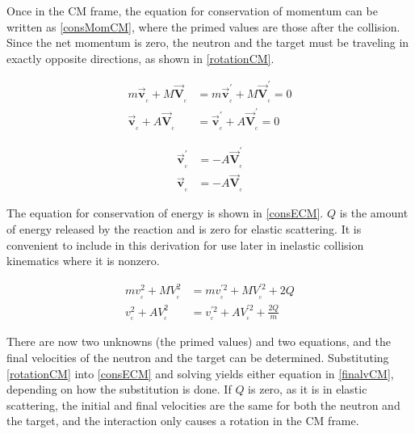 Once in the CM frame, the equation for conservation of momentum can be written as \eqref{consMomCM}, where the primed values are those after the collision.  Since the net momentum is zero, the neutron and the target must be traveling in exactly opposite directions, as shown in \eqref{rotationCM}.

\begin{equation}
\begin{split}
m \boldsymbol{\vec{v}_{_\mathrm{c}}} + M \boldsymbol{\vec{V}_{_\mathrm{c}}} &= m \boldsymbol{\vec{v}_{_\mathrm{c}}^\prime} + M \boldsymbol{\vec{V}_{_\mathrm{c}}^\prime} = 0\\
    \boldsymbol{\vec{v}_{_\mathrm{c}}} + A  \boldsymbol{\vec{V}_{_\mathrm{c}}} &=     \boldsymbol{\vec{v}_{_\mathrm{c}}^\prime} + A  \boldsymbol{\vec{V}_{_\mathrm{c}}^\prime} = 0
\end{split}
\label{consMomCM}
\end{equation}

\begin{equation}
\begin{split}
\boldsymbol{\vec{v}_{_\mathrm{c}}^\prime} &= - A  \boldsymbol{\vec{V}_{_\mathrm{c}}^\prime} \\
\boldsymbol{\vec{v}_{_\mathrm{c}}} &= -A  \boldsymbol{\vec{V}_{_\mathrm{c}}}
\end{split}
\label{rotationCM}
\end{equation}

The equation for conservation of energy is shown in \eqref{consECM}.  $Q$ is the amount of energy released by the reaction and is zero for elastic scattering.  It is convenient to include in this derivation for use later in inelastic collision kinematics where it is nonzero.

\begin{equation}
\begin{split}
m v_{_\mathrm{c}}^2 + M V_{_\mathrm{c}}^2 &= m v_{_\mathrm{c}}^{\prime2} + M V_{_\mathrm{c}}^{\prime2} + 2Q \\
    v_{_\mathrm{c}}^2 + A  V_{_\mathrm{c}}^2 &=     v_{_\mathrm{c}}^{\prime2} + A  V_{_\mathrm{c}}^{\prime2} + \frac{2Q}{m}
\end{split}
\label{consECM}
\end{equation}

There are now two unknowns (the primed values) and two equations, and the final velocities of the neutron and the target can be determined.  Substituting \eqref{rotationCM} into \eqref{consECM} and solving yields either equation in \eqref{finalvCM}, depending on how the substitution is done.  If $Q$ is zero, as it is in elastic scattering, the initial and final velocities are the same for both the neutron and the target, and the interaction only causes a rotation in the CM frame.

